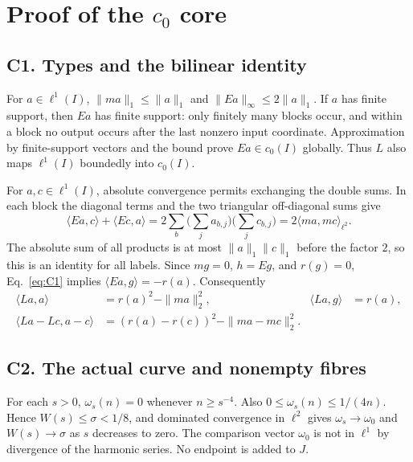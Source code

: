 \documentclass[11pt]{article}
\newcommand{\pair}[2]{\langle #1,#2\rangle}
\begin{document}
\section{Proof of the $c_0$ core}
\label{sec:c0}
\subsection{C1. Types and the bilinear identity}
\label{sec:C1}
For $a\in\ell^1(I)$, $\|ma\|_1\le\|a\|_1$ and
$\|Ea\|_\infty\le2\|a\|_1$. If $a$ has finite support, then $Ea$ has
finite support: only finitely many blocks occur, and within a block no
output occurs after the last nonzero input coordinate. Approximation by
finite-support vectors and the bound prove $Ea\in c_0(I)$ globally.
Thus $L$ also maps $\ell^1(I)$ boundedly into $c_0(I)$.

For $a,c\in\ell^1(I)$, absolute convergence permits exchanging the double
sums. In each block the diagonal terms and the two triangular
off-diagonal sums give
\begin{equation}
\pair{Ea}{c}+\pair{Ec}{a}
 =2\sum_b\Big(\sum_j a_{b,j}\Big)\Big(\sum_j c_{b,j}\Big)
 =2\pair{ma}{mc}_{\ell^2}.
\tag{C1}\label{eq:C1}
\end{equation}
The absolute sum of all products is at most $\|a\|_1\|c\|_1$ before the
factor $2$, so this is an identity for all labels. Since $mg=0$, $h=Eg$,
and $r(g)=0$, Eq.~\eqref{eq:C1} implies $\pair{Ea}{g}=-r(a)$.
Consequently
\begin{equation}
\begin{aligned}
\pair{La}{a}&=r(a)^2-\|ma\|_2^2,&
\pair{La}{g}&=r(a),\\
\pair{La-Lc}{a-c}&=(r(a)-r(c))^2-\|ma-mc\|_2^2.
\end{aligned}
\tag{C2}\label{eq:C2}
\end{equation}

\subsection{C2. The actual curve and nonempty fibres}
\label{sec:C2}
For each $s>0$, $\omega_s(n)=0$ whenever $n\ge s^{-4}$. Also
$0\le\omega_s(n)\le1/(4n)$. Hence $W(s)\le\sigma<1/8$, and dominated
convergence in $\ell^2$ gives $\omega_s\to\omega_0$ and $W(s)\to\sigma$
as $s$ decreases to zero. The comparison vector $\omega_0$ is not in
$\ell^1$ by divergence of the harmonic series. No endpoint is added to $J$.
\end{document}
